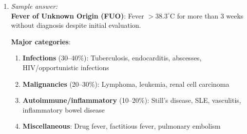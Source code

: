 \documentclass[11pt]{article}
\begin{document}
\begin{enumerate}[label=\textbf{\arabic*.}]
  \textbf{Left-sided heart failure}:
  \begin{itemize}
    \item \textbf{Causes}: Ischemic heart disease, hypertension, aortic/mitral valve disease, cardiomyopathy
    \item \textbf{Features}: Dyspnea, orthopnea, paroxysmal nocturnal dyspnea (PND), pulmonary edema 
    (rales on auscultation), S3 gallop
    \item \textbf{Mechanism}: Inability to pump blood forward $\to$ pulmonary congestion
  \end{itemize}

  \textbf{Right-sided heart failure}:
  \begin{itemize}
    \item \textbf{Causes}: Left heart failure (most common), pulmonary hypertension, tricuspid/pulmonary 
    valve disease, cor pulmonale
    \item \textbf{Features}: Jugular venous distension (JVD), hepatomegaly, ascites, peripheral edema, 
    hepatojugular reflux
    \item \textbf{Mechanism}: Inability to pump blood forward from right ventricle $\to$ systemic venous 
    congestion
  \end{itemize}

  \textbf{Biventricular failure}:
  \begin{itemize}
    \item Combination of left and right heart failure features
    \item Most common presentation in advanced heart failure
  \end{itemize}

  \textbf{This patient}: Has features of both left (dyspnea, orthopnea) and right (JVD, edema) heart 
  failure, indicating biventricular failure.

  \item \emph{Sample answer:}\\
  \textbf{Fever of Unknown Origin (FUO)}: Fever $>38.3^\circ$C for more than 3 weeks without diagnosis 
  despite initial evaluation.

  \textbf{Major categories}:
  \begin{enumerate}
    \item \textbf{Infections} (30--40\%): Tuberculosis, endocarditis, abscesses, HIV/opportunistic infections
    \item \textbf{Malignancies} (20--30\%): Lymphoma, leukemia, renal cell carcinoma
    \item \textbf{Autoimmune/inflammatory} (10--20\%): Still's disease, SLE, vasculitis, inflammatory 
    bowel disease
    \item \textbf{Miscellaneous}: Drug fever, factitious fever, pulmonary embolism
  \end{enumerate}


\end{enumerate}
\end{document}

